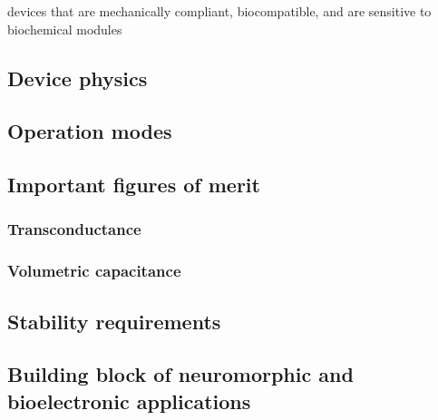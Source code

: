 devices that are mechanically compliant, biocompatible, and are sensitive to biochemical modules \cite{tan_organic_2022}

\subsection{Device physics}

\subsection{Operation modes}

\subsection{Important figures of merit}
\subsubsection{Transconductance}
\subsubsection{Volumetric capacitance}

\subsection{Stability requirements}

\subsection{Building block of neuromorphic and bioelectronic applications}

